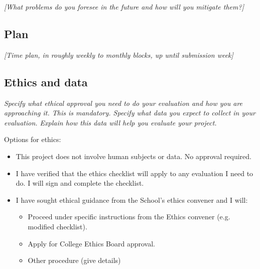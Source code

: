 \documentclass[11pt]{article}
\begin{document}
\emph{{[}What problems do you foresee in the future and how will you
mitigate them?{]}}

\subsection{Plan}\label{plan}

\emph{{[}Time plan, in roughly weekly to monthly blocks, up until
submission week{]}}

    
\subsection{Ethics and data}\label{ethics}
\emph{Specify what ethical approval you need to do your evaluation and how you are approaching it. This is mandatory. 
Specify what data you expect to collect in your evaluation. Explain how this data will help you evaluate your project.
}

Options for ethics:
\begin{itemize}
    \item This project does not involve human subjects or data. No approval required.
    \item I have verified that the ethics checklist will apply to any evaluation I need to do. I will sign and complete the checklist.
    \item I have sought ethical guidance from the School's ethics convener and I will:
    \begin{itemize}
        \item Proceed under specific instructions from the Ethics convener (e.g. modified checklist).
        \item Apply for College Ethics Board approval.
        \item Other procedure (give details)
    \end{itemize}
\end{itemize}
\end{document}
